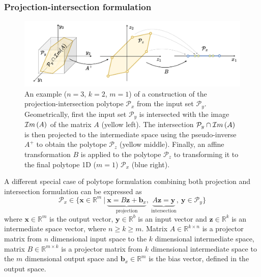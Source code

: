 \subsubsection{Projection-intersection formulation}
\begin{figure}
    \centering
    \includegraphics[width=\linewidth]{Chapters/imgs/spec_proj_int.pdf}
    \caption{An example ($n=3$, $k=2$, $m=1$) of a construction of the projection-intersection polytope $\mathcal{P}_x$ from the input set $\mathcal{P}_y$. 
    Geometrically, first the input set $\mathcal{P}_y$ is intersected with the image $\mathcal{I}m\left(A\right)$ of the matrix $A$ (yellow left). The intersection $\mathcal{P}_y\cap\mathcal{I}m\left(A\right)$ is then projected to the intermediate space using the pseudo-inverse $A^+$ to obtain the polytope $\mathcal{P}_z$ (yellow middle). Finally, an affine transformation $B$ is applied to the polytope $\mathcal{P}_z$ to transforming it to the final polytope 1D ($m=1$) $\mathcal{P}_x$ (blue right).}
    \label{fig:proj_inter_spec}
\end{figure}

A different special case of polytope formulation combining both projection and intersection formulation can be expressed as 
\begin{equation}
    \mathcal{P}_x \in \{\bm{x}\in \mathbb{R}^m~|~ \underbrace{\bm{x} = B \bm{z} + \bm{b}_x}_{\text{projection}},~ \underbrace{A\bm{z}=\bm{y}}_{\text{intersection}},~ \bm{y} \in \mathcal{P}_y\} 
    \label{eq:proj_inter_poly}
\end{equation}
where $\bm{x}\in\mathbb{R}^m$ is the output vector, $\bm{y} \in \mathbb{R}^b$ is an input vector and $\bm{z}\in\mathbb{R}^k$ is an intermediate space vector, where $n\!\geq\!k\!\geq\!m$. Matrix $A\in \mathbb{R}^{k \times n}$ is a projector matrix from $n$ dimensional input space to the $k$ dimensional intermediate space, matrix $B\in \mathbb{R}^{m\times k}$ is a projector matrix from $k$ dimensional intermediate space to the $m$ dimensional output space and $\bm{b}_x\in\mathbb{R}^m$ is the bias vector, defined in the output space.


